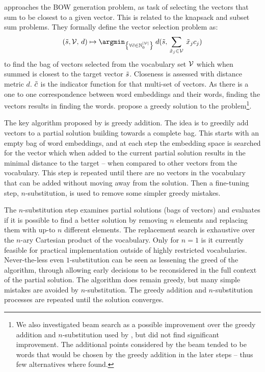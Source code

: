 {\textcite{White2015BOWgen} approaches the BOW generation problem, as task of selecting the vectors that sum to be closest to a given vector. This is related to the knapsack and subset sum problems. They formally define the vector selection problem as:
\[
(\s,\V,\,d) \mapsto \argmin_{\left\{ \forall\c\in\N_{0}^{|\V|}\right\} }\:d( \s,\,\sum_{\x_j\in\V}\:\x_{j}c_{j})
\]
to find the bag of vectors selected from the vocabulary set $\mathcal{V}$ which when summed is closest to the target vector $\tilde{s}$. Closeness is assessed with distance metric $d$. $\tilde{c}$ is the indicator function for that multi-set of vectors. As there is a one to one correspondence between word embeddings and their words, finding the vectors results in finding the words. \textcite{White2015BOWgen} propose a greedy solution to the problem\footnote{We also investigated beam search as a possible improvement over the  greedy addition and $n$-substitution  used by \textcite{White2015BOWgen}, but did not find significant improvement. The additional points considered by the beam tended to be words that would be chosen by the greedy addition in the later steps -- thus few alternatives where found.}.

The key algorithm  proposed by \textcite{White2015BOWgen} is greedy addition. The idea is to greedily add vectors to a partial solution building towards a complete bag. This starts with an empty bag of word embeddings, and at each step the embedding space is searched for the vector which when added to the current partial solution results in the minimal distance to the target -- when compared to other vectors from the vocabulary. This step is repeated until there are no vectors in the vocabulary that can be added without moving away from the solution. Then a fine-tuning step, $n$-substitution, is used to remove some simpler greedy mistakes.

The $n$-substitution step examines partial solutions (bags of vectors) and evaluates if it is possible to find a better solution by removing $n$ elements and replacing them with up-to $n$ different elements. The replacement search is exhaustive over the $n$-ary Cartesian product of the vocabulary. Only for $n=1$ is it currently feasible for practical implementation outside of highly restricted vocabularies. Never-the-less even $1$-substitution can be seen as lessening the greed of the algorithm, through allowing early decisions to be reconsidered in the full context of the partial solution. The algorithm does remain greedy, but many simple mistakes are avoided by $n$-substitution. The greedy addition and $n$-substitution processes are repeated until the solution converges.



}
